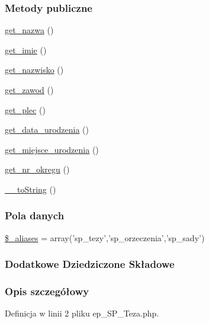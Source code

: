 \subsubsection*{Metody publiczne}
\begin{DoxyCompactItemize}
\item 
\hyperlink{classep___s_p___teza_ac0818f0049d7b84f08f77128f54cee36}{get\-\_\-nazwa} ()
\item 
\hyperlink{classep___s_p___teza_ac4b0c85dc2a130038f2d118dbd0c3d77}{get\-\_\-imie} ()
\item 
\hyperlink{classep___s_p___teza_abdd1d7ff92508da7f748ba1feec97af0}{get\-\_\-nazwisko} ()
\item 
\hyperlink{classep___s_p___teza_af80ca8310b60004454dd02a387deaa2c}{get\-\_\-zawod} ()
\item 
\hyperlink{classep___s_p___teza_ac7f9af5c3fa024e4c26a7b6bd4ce4bb4}{get\-\_\-plec} ()
\item 
\hyperlink{classep___s_p___teza_a880b240cd2d8c336fd1709bf0cb1ae2c}{get\-\_\-data\-\_\-urodzenia} ()
\item 
\hyperlink{classep___s_p___teza_ac57c08ec5e394a19c5bd9280c8376182}{get\-\_\-miejsce\-\_\-urodzenia} ()
\item 
\hyperlink{classep___s_p___teza_a2645a9f0aa5b0ccc482943348c033d0a}{get\-\_\-nr\-\_\-okregu} ()
\item 
\hyperlink{classep___s_p___teza_a7516ca30af0db3cdbf9a7739b48ce91d}{\-\_\-\-\_\-to\-String} ()
\end{DoxyCompactItemize}
\subsubsection*{Pola danych}
\begin{DoxyCompactItemize}
\item 
\hyperlink{classep___s_p___teza_ab4e31d75f0bc5d512456911e5d01366b}{\$\-\_\-aliases} = array('sp\-\_\-tezy','sp\-\_\-orzeczenia','sp\-\_\-sady')
\end{DoxyCompactItemize}
\subsubsection*{Dodatkowe Dziedziczone Składowe}


\subsubsection{Opis szczegółowy}


Definicja w linii 2 pliku ep\-\_\-\-S\-P\-\_\-\-Teza.\-php.



